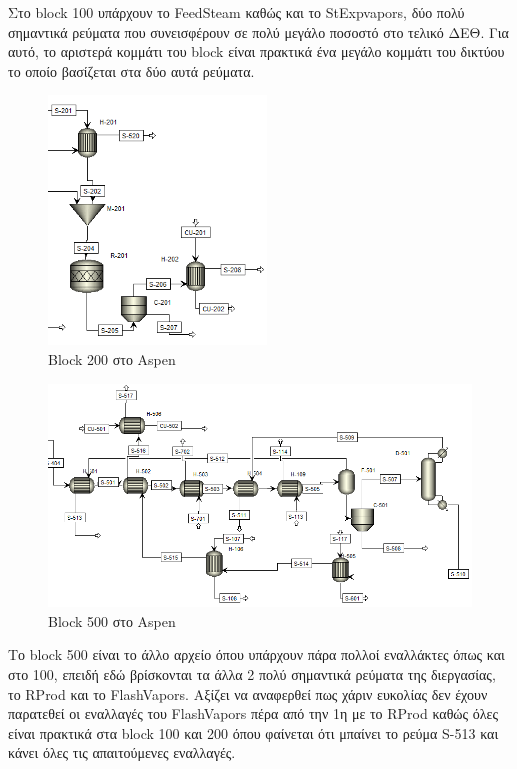 \documentclass[11pt]{article}
\begin{document}
Στο block 100 υπάρχουν το FeedSteam καθώς και το StExpvapors, δύο πολύ σημαντικά ρεύματα που συνεισφέρουν σε πολύ μεγάλο ποσοστό στο τελικό ΔΕΘ. Για αυτό, το αριστερά κομμάτι του block είναι πρακτικά ένα μεγάλο κομμάτι του δικτύου το οποίο βασίζεται στα δύο αυτά ρεύματα.

\begin{figure}[htbp]
\centering
\includegraphics[height=250px]{Blocks_της_διεργασίας_μετά_την_ενεργειακή_ολοκλήρωση/2023-04-27_14-50-58_screenshot.png}
\caption{Block 200 στο Aspen}
\end{figure}


\begin{figure}[htbp]
\centering
\includegraphics[width=.9\linewidth]{Blocks_της_διεργασίας_μετά_την_ενεργειακή_ολοκλήρωση/2023-04-27_14-54-20_screenshot.png}
\caption{Block 500 στο Aspen}
\end{figure}

Το block 500 είναι το άλλο αρχείο όπου υπάρχουν πάρα πολλοί εναλλάκτες όπως και στο 100, επειδή εδώ βρίσκονται τα άλλα 2 πολύ σημαντικά ρεύματα της διεργασίας, το RProd και το FlashVapors. Αξίζει να αναφερθεί πως χάριν ευκολίας δεν έχουν παρατεθεί οι εναλλαγές του FlashVapors πέρα από την 1η με το RProd καθώς όλες είναι πρακτικά στα block 100 και 200 όπου φαίνεται ότι μπαίνει το ρεύμα S-513 και κάνει όλες τις απαιτούμενες εναλλαγές.
\end{document}
